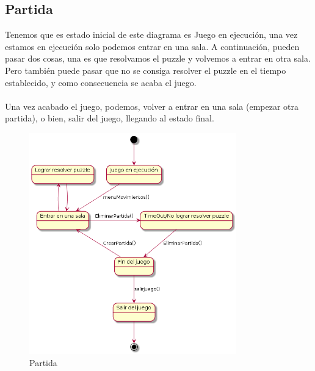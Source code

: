 \subsection{Partida}\label{sec:uc0}
  Tenemos que es estado inicial de este diagrama es Juego en ejecución, una vez estamos en ejecución solo podemos entrar en una sala. A continuación, pueden pasar dos cosas, una es que resolvamos el puzzle y volvemos a entrar en otra sala. Pero también puede pasar que no se consiga resolver el puzzle en el tiempo establecido, y como consecuencia se acaba el juego.
  \\
  \\Una vez acabado el juego, podemos, volver a entrar en una sala (empezar otra partida), o bien, salir del juego, llegando al estado final.
  \\
\begin{figure}[ht]
	\centering
	\includegraphics[width=0.8\textwidth]{./imatges/Partida.png}
	\caption{Partida}
\end{figure}
  
